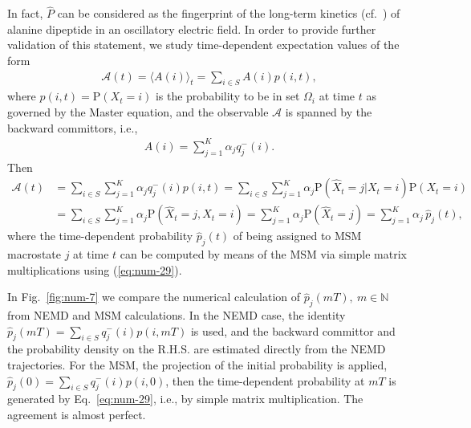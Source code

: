 \documentclass[aps, pre, preprint,unsortedaddress,a4paper,onecolumn,showkeys]{revtex4}
\newcommand{\recheck}[1]{{\color{red} #1}}
\newcommand{\bwd}[0]{-}
\newcommand{\prob}{\textrm{P}}
\begin{document}
In fact, $\hat{P}$ can be considered as the fingerprint of the long-term kinetics (cf.~\cite{A19-39,PrinzKellerNoe_PCCP11_Perspective}) of alanine dipeptide in an oscillatory electric field.
In order to provide further validation of this statement, we study  time-dependent expectation values of
the form
\begin{align}
  \mathcal A(t) = \langle A(i)\rangle_t = \sum_{i\in S} A(i) p(i,t),
\end{align}
where $p(i,t)=\prob(X_t=i)$ is the probability to be in set $\Omega_i$ at time $t$ as governed by the Master equation, and the observable $\mathcal A$ is  spanned by the backward
committors, i.e.,
\begin{align}\label{A}
  A(i) = \sum_{j=1}^K \alpha_j q^\bwd_j(i).
\end{align}
Then
\begin{align}\nonumber
  \mathcal A(t) &=
  \sum_{i\in S} \sum_{j=1}^K \alpha_j q^\bwd_j(i)  p(i,t)=\sum_{i\in S} \sum_{j=1}^K \alpha_j \prob (\hat X_t = j \vert X_t = i) \prob (X_t = i) \\
  & =
  \sum_{i\in S} \sum_{j=1}^K \alpha_j \prob (\hat X_t = j ,X_t = i)  =
  \sum_{j=1}^K \alpha_j \prob (\hat X_t = j) 
 =
   \sum_{j=1}^K \alpha_j \,\hat p_j (t), \label{eq:num-28}
\end{align}
where the time-dependent probability $\hat{p}_j(t)$ of being assigned to MSM macrostate $j$ at time $t$ can be computed  by means of the MSM via simple matrix multiplications using (\ref{eq:num-29}).

In Fig.~\ref{fig:num-7} we compare the numerical calculation of $\hat p_j (mT), \ m\in\mathbb N$ from NEMD and MSM calculations.
In the NEMD case, the identity  $\hat p_j (mT) = \sum_{i\in S}  q^\bwd_j(i)  p(i,mT) $ is used, and
the backward committor and the probability density on the R.H.S.
are estimated directly from the
NEMD trajectories. For the MSM, the projection of the initial probability is applied, $\hat p_j (0) = \sum_{i\in S}  q^\bwd_j(i)  p(i,0) $, then
the time-dependent probability at $mT$ is generated by Eq.~\eqref{eq:num-29}, i.e., by simple matrix multiplication. The agreement is almost perfect.

\end{document}
